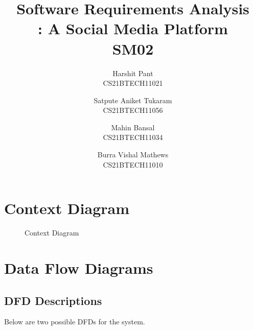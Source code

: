 \documentclass[11pt]{article}
\title{Software Requirements Analysis\\\Name : A Social Media Platform\\ SM02}
\author{Harshit Pant \\ CS21BTECH11021 \and Satpute Aniket Tukaram \\ CS21BTECH11056 \and Mahin Bansal \\ CS21BTECH11034 \and Burra Vishal Mathews \\ CS21BTECH11010}
\date{}
\begin{document}
\maketitle
\begin{center}
    \tableofcontents
\end{center}
\newpage
\section{Context Diagram}
\begin{figure}[H]
    \centering
    \caption{Context Diagram}
    \label{fig:context_diagram}
\end{figure}
\newpage
\section{Data Flow Diagrams}
\subsection{DFD Descriptions}
Below are two possible DFDs for the system.
\end{document}
